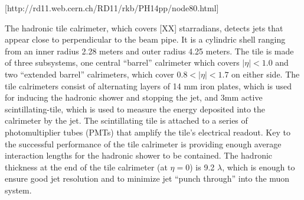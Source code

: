 [http://rd11.web.cern.ch/RD11/rkb/PH14pp/node80.html]

The hadronic tile calrimeter, which covers [XX] starradians, detects jets that appear close to perpendicular to the beam pipe.
It is a cylindric shell ranging from an inner radius 2.28 meters and outer radius 4.25 meters.
The tile is made of three subsystems, one central ``barrel'' calrimeter which covers $|\eta| < 1.0$ and two ``extended barrel'' calrimeters, which cover $0.8 < |\eta| < 1.7$ on either side.
The tile calrimeters consist of alternating layers of 14 mm iron plates, which is used for inducing the hadronic shower and stopping the jet, and 3mm active scintillating-tile, which is used to measure the energy deposited into the calrimeter by the jet.
The scintillating tile is attached to a series of photomultiplier tubes (PMTs) that amplify the tile's electrical readout.
Key to the successful performance of the tile calrimeter is providing enough average interaction lengths for the hadronic shower to be contained.
The hadronic thickness at the end of the tile calrimeter (at $\eta=0$) is 9.2 $\lambda$, which is enough to ensure good jet resolution and to minimize jet ``punch through'' into the muon system.
